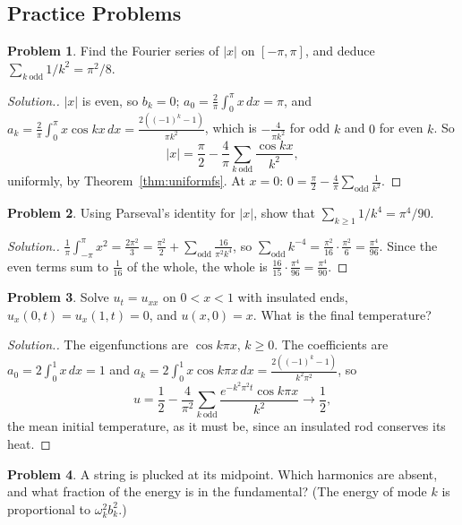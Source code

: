\documentclass[11pt,a4paper]{article}
\numberwithin{equation}{section}
\theoremstyle{definition}
\newtheorem{problemx}{Problem}[subsection]
\newenvironment{problem}{\begin{problemx}}{\end{problemx}}
\newenvironment{solution}
  {\renewcommand{\qedsymbol}{}\begin{proof}[\textit{Solution}.]}
  {\end{proof}}
\begin{document}
\subsection{Practice Problems}

\begin{problem}
Find the Fourier series of $|x|$ on $[-\pi, \pi]$, and deduce $\sum_{k\ \text{odd}}1/k^2 = \pi^2/8$.
\end{problem}

\begin{solution}
$|x|$ is even, so $b_k = 0$; $a_0 = \frac2\pi\int_0^\pi x\,dx = \pi$, and $a_k = \frac2\pi\int_0^\pi x\cos kx\,dx = \frac{2((-1)^k - 1)}{\pi k^2}$, which is $-\frac4{\pi k^2}$ for odd $k$ and $0$ for even $k$. So
\[
|x| = \frac\pi2 - \frac4\pi\sum_{k\ \text{odd}}\frac{\cos kx}{k^2} ,
\]
uniformly, by Theorem~\ref{thm:uniformfs}. At $x = 0$: $0 = \frac\pi2 - \frac4\pi\sum_{\text{odd}}\frac1{k^2}$.
\end{solution}

\begin{problem}
Using Parseval's identity for $|x|$, show that $\sum_{k \geq 1}1/k^4 = \pi^4/90$.
\end{problem}

\begin{solution}
$\frac1\pi\int_{-\pi}^\pi x^2 = \frac{2\pi^2}3 = \frac{\pi^2}2 + \sum_{\text{odd}}\frac{16}{\pi^2k^4}$, so $\sum_{\text{odd}}k^{-4} = \frac{\pi^2}{16}\cdot\frac{\pi^2}6 = \frac{\pi^4}{96}$. Since the even terms sum to $\frac1{16}$ of the whole, the whole is $\frac{16}{15}\cdot\frac{\pi^4}{96} = \frac{\pi^4}{90}$.
\end{solution}

\begin{problem}
Solve $u_t = u_{xx}$ on $0 < x < 1$ with insulated ends, $u_x(0, t) = u_x(1, t) = 0$, and $u(x, 0) = x$. What is the final temperature?
\end{problem}

\begin{solution}
The eigenfunctions are $\cos k\pi x$, $k \geq 0$. The coefficients are $a_0 = 2\int_0^1x\,dx = 1$ and $a_k = 2\int_0^1x\cos k\pi x\,dx = \frac{2((-1)^k - 1)}{k^2\pi^2}$, so
\[
u = \frac12 - \frac4{\pi^2}\sum_{k\ \text{odd}}\frac{e^{-k^2\pi^2t}\cos k\pi x}{k^2} \to \frac12 ,
\]
the mean initial temperature, as it must be, since an insulated rod conserves its heat.
\end{solution}

\begin{problem}
A string is plucked at its midpoint. Which harmonics are absent, and what fraction of the energy is in the fundamental? (The energy of mode $k$ is proportional to $\omega_k^2b_k^2$.)
\end{problem}
\end{document}
